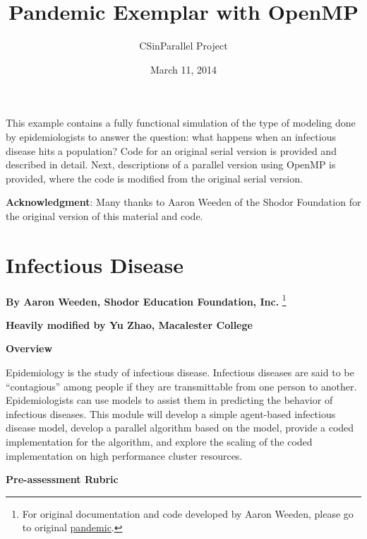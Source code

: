 \documentclass[letterpaper,10pt,openany,oneside]{sphinxmanual}
\title{Pandemic Exemplar with OpenMP}
\date{March 11, 2014}
\author{CSinParallel Project}
\begin{document}
\maketitle
\tableofcontents
{}\label{index::doc}


This example contains a fully functional simulation of the type of modeling done by epidemiologists to answer the question: what happens when an infectious disease hits a population?  Code for an original serial version is provided and described in detail.  Next, descriptions of a parallel version using OpenMP is provided, where the code is modified from the original serial version.

\textbf{Acknowledgment}: Many thanks to Aaron Weeden of the Shodor Foundation for the original version of this material and code.


\chapter{Infectious Disease}
\label{0-Introduction/introduction:pandemic-modeling-exemplar-using-openmp}\label{0-Introduction/introduction:infectious-disease}\label{0-Introduction/introduction::doc}
\textbf{By Aaron Weeden, Shodor Education Foundation, Inc.} \footnote{
For original documentation and code developed by Aaron Weeden, please go to original \href{http://www.shodor.org/petascale/materials/UPModules/infectiousDisease/}{pandemic}.
}

\textbf{Heavily modified by Yu Zhao, Macalester College}

\textbf{Overview}

Epidemiology is the study of infectious disease. Infectious diseases are
said to be “contagious” among people if they are transmittable from one
person to another. Epidemiologists can use models to assist them in
predicting the behavior of infectious diseases. This module will develop
a simple agent-based infectious disease model, develop a parallel
algorithm based on the model, provide a coded implementation for the
algorithm, and explore the scaling of the coded implementation on high
performance cluster resources.

\textbf{Pre-assessment Rubric}
\end{document}
